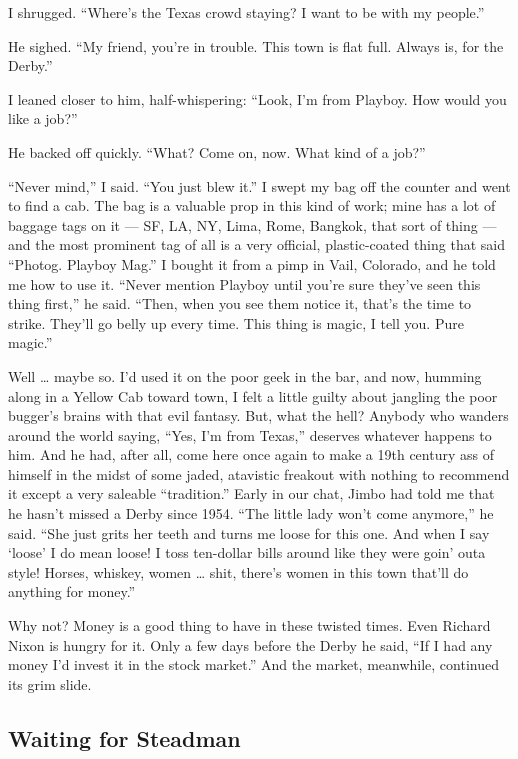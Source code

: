 \documentclass[9pt,a4paper]{extarticle}
\begin{document}
I shrugged. “Where’s the Texas crowd staying? I want to be with my people.”

He sighed. “My friend, you’re in trouble. This town is flat full. Always is, for the Derby.”

I leaned closer to him, half-whispering: “Look, I’m from Playboy. How would you like a job?”

He backed off quickly. “What? Come on, now. What kind of a job?”

“Never mind,” I said. “You just blew it.” I swept my bag off the counter and went to find a cab. The bag is a valuable prop in this kind of work; mine has a lot of baggage tags on it — SF, LA, NY, Lima, Rome, Bangkok, that sort of thing — and the most prominent tag of all is a very official, plastic-coated thing that said “Photog. Playboy Mag.” I bought it from a pimp in Vail, Colorado, and he told me how to use it. “Never mention Playboy until you’re sure they’ve seen this thing first,” he said. “Then, when you see them notice it, that’s the time to strike. They’ll go belly up every time. This thing is magic, I tell you. Pure magic.”

Well … maybe so. I’d used it on the poor geek in the bar, and now, humming along in a Yellow Cab toward town, I felt a little guilty about jangling the poor bugger’s brains with that evil fantasy. But, what the hell? Anybody who wanders around the world saying, “Yes, I’m from Texas,” deserves whatever happens to him. And he had, after all, come here once again to make a 19th century ass of himself in the midst of some jaded, atavistic freakout with nothing to recommend it except a very saleable “tradition.” Early in our chat, Jimbo had told me that he hasn’t missed a Derby since 1954. “The little lady won’t come anymore,” he said. “She just grits her teeth and turns me loose for this one. And when I say ‘loose’ I do mean loose! I toss ten-dollar bills around like they were goin’ outa style! Horses, whiskey, women … shit, there’s women in this town that’ll do anything for money.”

Why not? Money is a good thing to have in these twisted times. Even Richard Nixon is hungry for it. Only a few days before the Derby he said, “If I had any money I’d invest it in the stock market.” And the market, meanwhile, continued its grim slide.

\subsection{Waiting for Steadman}
\end{document}
